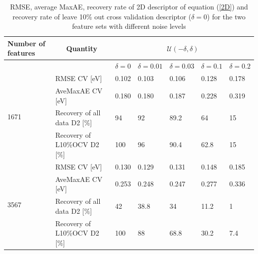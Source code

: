 \documentclass[11pt,oneside,czech,american]{book} %
\theoremstyle{plain}
\theoremstyle{definition}
\begin{document}
\begin{table}[H]
	\centering
	\label{sense_E}
	\begin{tabular}{lllllll} 
		\hline
		Number of features    & \multicolumn{1}{c}{Quantity} & \multicolumn{5}{c}{$\mathcal{U}(-\delta, \delta)$}          \\ 
		\hline
		& \multicolumn{1}{c}{}         & $\delta=0$     & $\delta=0.01$  & $\delta=0.03$  & $\delta=0.1$   & $\delta=0.2$    \\ 
		\hline
		\multirow{4}{*}{1671} & RMSE CV [eV]                  & 0.102 & 0.103 & 0.106 & 0.128 & 0.178  \\ 		
		& AveMaxAE CV [eV]              & 0.180 & 0.180 & 0.187 & 0.228 & 0.319  \\ 		
		& Recovery of all data D2 [\%]  & 94    & 92    & 89.2  & 64    & 15     \\ 		
		& Recovery of L10\%OCV D2 [\%]  & 100   & 96    & 90.4  & 62.8  & 15     \\ 
		\hline
		\multirow{4}{*}{3567} & RMSE CV [eV]                  & 0.130 & 0.129 & 0.131 & 0.148 & 0.185  \\ 
		
		& AveMaxAE CV [eV]              & 0.253 & 0.248 & 0.247 & 0.277 & 0.336  \\ 
		
		& Recovery of all data D2 [\%]  & 42    & 38.8  & 34    & 11.2  & 1      \\ 
		
		& Recovery of L10\%OCV D2 [\%]  & 100   & 88    & 68.8  & 30.2  & 7.4    \\
		\hline
	\end{tabular}
	\caption{RMSE, average MaxAE, recovery rate of 2D descriptor of equation (\ref{2D}) and recovery rate of leave 10\% out cross validation descriptor ($\delta=0$) for the two feature sets with different noise levels}
\end{table}
\end{document}
